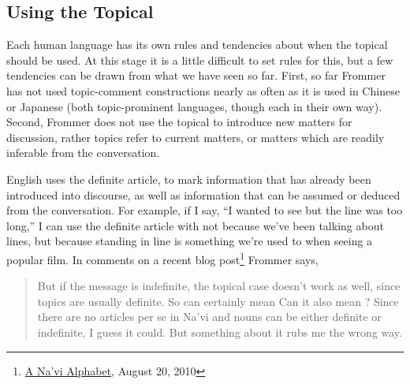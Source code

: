 \begin{quotation}
\noindent{}

\medskip
{}
\end{quotation}


\subsection{Using the Topical}
Each human language has its own rules and tendencies about when the
topical should be used.  At this stage it is a little difficult to set
rules for this, but a few tendencies can be drawn from what we have
seen so far.  First, so far Frommer has not used topic-comment
constructions nearly as often as it is used in Chinese or Japanese
(both topic-prominent languages, though each in their own way).
Second, Frommer does not use the topical to introduce new matters for
discussion, rather topics refer to current matters, or matters which
are readily inferable from the conversation.

English uses the definite article,  to mark information that
has already been introduced into discourse, as well as information
that can be assumed or deduced from the conversation.  For example, if
I say, ``I wanted to see  but the line was too long,'' I
can use the definite article with  not because we've been
talking about lines, but because standing in line is something we're
used to when seeing a popular film.  In comments on a recent blog
post\footnote{\href{https://naviteri.org/2010/08/20/}{A
Na'vi Alphabet}, August 20, 2010} Frommer says, 

\begin{quote}But if the message is indefinite, the topical case
doesn’t work as well, since topics are usually definite. So
 can certainly mean  Can it also mean ? Since there are no articles per se in Na’vi
and nouns can be either definite or indefinite, I guess it
could. But something about it rubs me the wrong way.
\end{quote}

